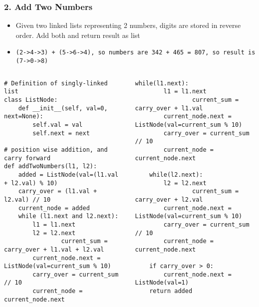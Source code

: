 \begin{frame}[fragile]\frametitle{2. Add Two Numbers}


	\begin{itemize}
	\item Given two linked lists representing 2 numbers, digits are stored in reverse order. Add both and return result as list
	\item \lstinline|(2->4->3) + (5->6->4), so numbers are 342 + 465 = 807, so result is (7->0->8)|
	\end{itemize}
	
	\begin{columns}[T]
		\begin{lstlisting}[basicstyle=\scriptsize]
# Definition of singly-linked list
class ListNode:
    def __init__(self, val=0, next=None):
        self.val = val
        self.next = next
				
# position wise addition, and carry forward
def addTwoNumbers(l1, l2):
    added = ListNode(val=(l1.val + l2.val) % 10)
    carry_over = (l1.val + l2.val) // 10
    current_node = added
    while (l1.next and l2.next):
        l1 = l1.next
        l2 = l2.next
				current_sum = carry_over + l1.val + l2.val
        current_node.next = ListNode(val=current_sum % 10)
        carry_over = current_sum // 10
        current_node = current_node.next				
		\end{lstlisting}
		\begin{lstlisting}[basicstyle=\scriptsize]
    while(l1.next):
        l1 = l1.next
				current_sum = carry_over + l1.val 
        current_node.next = ListNode(val=current_sum % 10)
        carry_over = current_sum // 10
        current_node = current_node.next

    while(l2.next):
        l2 = l2.next
				current_sum = carry_over + l2.val
        current_node.next = ListNode(val=current_sum % 10)
        carry_over = current_sum // 10
        current_node = current_node.next

    if carry_over > 0:
        current_node.next = ListNode(val=1)
    return added
				\end{lstlisting}		
	\end{columns}
	
\end{frame}

